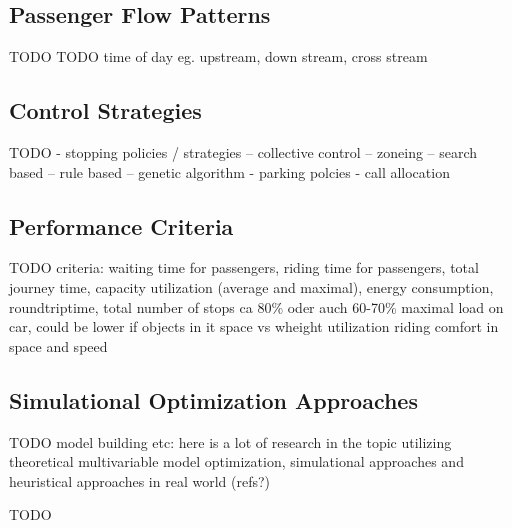 \subsection{Passenger Flow Patterns}
TODO
TODO time of day eg. upstream, down stream, cross stream

\autocite[][pp.~1--2]{beers2015arrivals}
\autocite[][pp.~6--7]{axelsson2013strategies}
\autocite[][p.~194]{unger2015aufzuege}

\subsection{Control Strategies}
TODO
- stopping policies / strategies
-- collective control
-- zoneing
-- search based
-- rule based
-- genetic algorithm
\autocite[][pp.~3--6]{axelsson2013strategies}
- parking polcies
- call allocation


\autocite[][pp.~3--4,10]{beers2015arrivals}

\subsection{Performance Criteria}
TODO
criteria: waiting time for passengers, riding time for passengers, total journey time, capacity utilization (average and maximal), energy consumption, roundtriptime, total number of stops
ca 80\% oder auch 60-70\% maximal load on car, could be lower if objects in it
space vs wheight utilization
riding comfort in space and speed

\autocite[][p.~10]{beers2015arrivals}


\subsection{Simulational Optimization Approaches}
TODO
model building etc: here is a lot of research in the topic utilizing theoretical multivariable model optimization, simulational approaches and heuristical approaches in real world (refs?)

\autocite[][pp.~7--11]{beers2015arrivals}
\autocite[][p.~193]{unger2015aufzuege}


TODO
